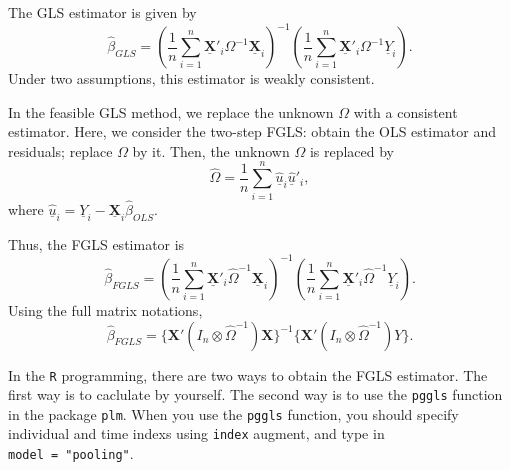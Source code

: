 \documentclass[
  12pt,
]{article}
\begin{document}
The GLS estimator is given by
\[
  \hat{\beta}_{GLS} 
  = \left( \frac{1}{n} \sum_{i=1}^n \underline{\mathbf{X}}'_i \Omega^{-1} \underline{\mathbf{X}}_i \right)^{-1}
  \left( \frac{1}{n} \sum_{i=1}^n \underline{\mathbf{X}}'_i \Omega^{-1} \underline{Y}_i \right).
\]
Under two assumptions, this estimator is weakly consistent.

In the feasible GLS method,
we replace the unknown \(\Omega\) with a consistent estimator.
Here, we consider the two-step FGLS:
obtain the OLS estimator and residuals; replace \(\Omega\) by it.
Then, the unknown \(\Omega\) is replaced by
\[
  \hat{\Omega} = \frac{1}{n} \sum_{i=1}^n \underline{\hat{u}}_i\underline{\hat{u}}'_i,
\]
where \(\underline{\hat{u}}_i = \underline{Y}_i - \underline{\mathbf{X}}_i \hat{\beta}_{OLS}\).

Thus, the FGLS estimator is
\[
  \hat{\beta}_{FGLS} 
  = \left( \frac{1}{n} \sum_{i=1}^n \underline{\mathbf{X}}'_i \hat{\Omega}^{-1} \underline{\mathbf{X}}_i \right)^{-1}
  \left( \frac{1}{n} \sum_{i=1}^n \underline{\mathbf{X}}'_i \hat{\Omega}^{-1} \underline{Y}_i \right).
\]
Using the full matrix notations,
\[
  \hat{\beta}_{FGLS}
  = \{ \mathbf{X}'(I_n \otimes \hat{\Omega}^{-1}) \mathbf{X} \}^{-1}
  \{ \mathbf{X}'(I_n \otimes \hat{\Omega}^{-1}) Y \}.
\]

In the \texttt{R} programming,
there are two ways to obtain the FGLS estimator.
The first way is to caclulate by yourself.
The second way is to use the \texttt{pggls} function in the package \texttt{plm}.
When you use the \texttt{pggls} function,
you should specify individual and time indexs using \texttt{index} augment,
and type in \texttt{model\ =\ "pooling"}.
\end{document}
